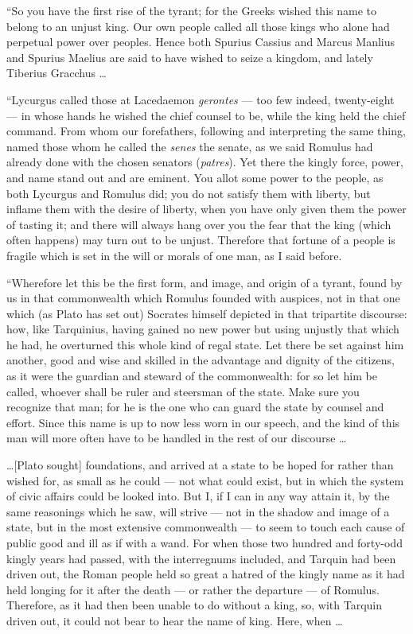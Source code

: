  ``So you have the first rise of the tyrant; for the Greeks wished this name to belong to an unjust king. Our own people called all those kings who alone had perpetual power over peoples. Hence both Spurius Cassius and Marcus Manlius and Spurius Maelius are said to have wished to seize a kingdom, and lately Tiberius Gracchus \ldots

 ``Lycurgus called those at Lacedaemon \textit{gerontes} --- too few indeed, twenty-eight --- in whose hands he wished the chief counsel to be, while the king held the chief command. From whom our forefathers, following and interpreting the same thing, named those whom he called the \textit{senes} the senate, as we said Romulus had already done with the chosen senators (\textit{patres}). Yet there the kingly force, power, and name stand out and are eminent. You allot some power to the people, as both Lycurgus and Romulus did; you do not satisfy them with liberty, but inflame them with the desire of liberty, when you have only given them the power of tasting it; and there will always hang over you the fear that the king (which often happens) may turn out to be unjust. Therefore that fortune of a people is fragile which is set in the will or morals of one man, as I said before.

 ``Wherefore let this be the first form, and image, and origin of a tyrant, found by us in that commonwealth which Romulus founded with auspices, not in that one which (as Plato has set out) Socrates himself depicted in that tripartite discourse: how, like Tarquinius, having gained no new power but using unjustly that which he had, he overturned this whole kind of regal state. Let there be set against him another, good and wise and skilled in the advantage and dignity of the citizens, as it were the guardian and steward of the commonwealth: for so let him be called, whoever shall be ruler and steersman of the state. Make sure you recognize that man; for he is the one who can guard the state by counsel and effort. Since this name is up to now less worn in our speech, and the kind of this man will more often have to be handled in the rest of our discourse \ldots

 \ldots [Plato sought] foundations, and arrived at a state to be hoped for rather than wished for, as small as he could --- not what could exist, but in which the system of civic affairs could be looked into. But I, if I can in any way attain it, by the same reasonings which he saw, will strive --- not in the shadow and image of a state, but in the most extensive commonwealth --- to seem to touch each cause of public good and ill as if with a wand. For when those two hundred and forty-odd kingly years had passed, with the interregnums included, and Tarquin had been driven out, the Roman people held so great a hatred of the kingly name as it had held longing for it after the death --- or rather the departure --- of Romulus. Therefore, as it had then been unable to do without a king, so, with Tarquin driven out, it could not bear to hear the name of king. Here, when \ldots

